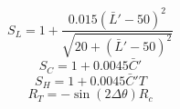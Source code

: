 \begin{appendices}
\begin{equation}
\end{equation}
\begin{equation}
S_{L}=1+\frac{0.015(\bar{L}'-50)^{2}}{\sqrt{20+(\bar{L}'-50)^{2}}}
\end{equation}
\begin{equation}
S_{C}=1+0.0045\bar{C}'
\end{equation}
\begin{equation}
S_{H}=1+0.0045\bar{C}'T
\end{equation}
\begin{equation}
R_{T}=-\sin(2 \Delta \theta)R_{c}
\end{equation}

\end{appendices}